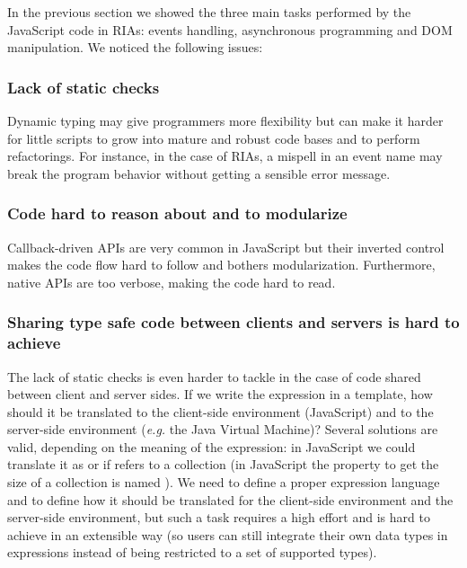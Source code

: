 \documentclass[american,english,runningheads]{llncs}
\newcommand{\eg}{\emph{e.g.}}
\begin{document}
In the previous section we showed the three main tasks performed by the JavaScript code in RIAs: events handling,
asynchronous programming and DOM manipulation. We noticed the following issues:

\subsubsection{Lack of static checks}

Dynamic typing may give programmers more flexibility but can make it harder for little scripts to grow into mature
and robust code bases and to perform refactorings. For instance, in the case of RIAs, a mispell in an event name may
break the program behavior without getting a sensible error message.

\subsubsection{Code hard to reason about and to modularize}

Callback-driven APIs are very common in JavaScript but their inverted control makes the code flow hard to follow and
bothers modularization. Furthermore, native APIs are too verbose, making the code hard to read.

\subsubsection{Sharing type safe code between clients and servers is hard to achieve}

The lack of static checks is even harder to tackle in the case of code shared between client and server sides. If we
write the expression  in a template, how should it be translated to the client-side environment
(JavaScript) and to the server-side environment (\eg{} the Java Virtual Machine)? Several solutions are valid,
depending on the meaning of the expression: in JavaScript we could translate it as  or
 if  refers to a collection (in JavaScript the property to get the size of a
collection is named ). We need to define a proper expression language and to define how it should be
translated for the client-side environment and the server-side environment, but such a task requires a high effort
and is hard to achieve in an extensible way (so users can still integrate their own data types in expressions instead
of being restricted to a set of supported types).
\end{document}
